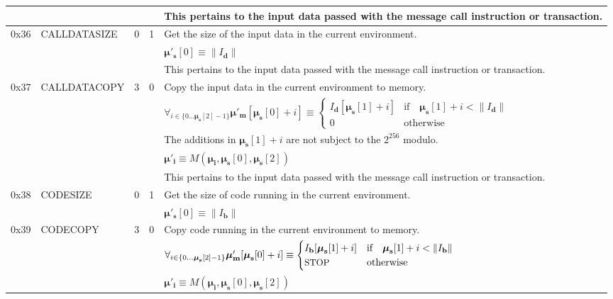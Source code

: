 \documentclass[9pt,oneside]{amsart}
\begin{document}
\begin{tabularx}{\textwidth}{rlrrX}
&&&& This pertains to the input data passed with the message call instruction or transaction. \\
\midrule
0x36 & {\small CALLDATASIZE} & 0 & 1 & Get the size of the input data in the current environment. \\
&&&& $\boldsymbol{\mu}'_\mathbf{s}[0] \equiv \lVert I_\mathbf{d} \rVert$ \\
&&&& This pertains to the input data passed with the message call instruction or transaction. \\
\midrule
0x37 & {\small CALLDATACOPY} & 3 & 0 & Copy the input data in the current environment to memory. \\
&&&& $\forall_{i \in \{ 0 \dots \boldsymbol{\mu}_\mathbf{s}[2] - 1\} } \boldsymbol{\mu}'_\mathbf{m}[\boldsymbol{\mu}_\mathbf{s}[0] + i ] \equiv
\begin{cases} I_\mathbf{d}[\boldsymbol{\mu}_\mathbf{s}[1] + i] & \text{if} \quad \boldsymbol{\mu}_\mathbf{s}[1] + i < \lVert I_\mathbf{d} \rVert \\ 0 & \text{otherwise} \end{cases}$\\
&&&& The additions in $\boldsymbol{\mu}_\mathbf{s}[1] + i$ are not subject to the $2^{256}$ modulo. \\
&&&& $\boldsymbol{\mu}'_\mathbf{i} \equiv M(\boldsymbol{\mu}_\mathbf{i}, \boldsymbol{\mu}_\mathbf{s}[0], \boldsymbol{\mu}_\mathbf{s}[2])$ \\
&&&& This pertains to the input data passed with the message call instruction or transaction. \\
\midrule
0x38 & {\small CODESIZE} & 0 & 1 & Get the size of code running in the current environment. \\
&&&& $\boldsymbol{\mu}'_\mathbf{s}[0] \equiv \lVert I_\mathbf{b} \rVert$ \\
\midrule
0x39 & {\small CODECOPY} & 3 & 0 & Copy code running in the current environment to memory. \\
&&&& $\forall_{i \in \{ 0 \dots \boldsymbol{\mu}_\mathbf{s}[2] - 1\} } \boldsymbol{\mu}'_\mathbf{m}[\boldsymbol{\mu}_\mathbf{s}[0] + i ] \equiv
\begin{cases} I_\mathbf{b}[\boldsymbol{\mu}_\mathbf{s}[1] + i] & \text{if} \quad \boldsymbol{\mu}_\mathbf{s}[1] + i < \lVert I_\mathbf{b} \rVert \\ \text{\small STOP} & \text{otherwise} \end{cases}$\\
&&&& $\boldsymbol{\mu}'_\mathbf{i} \equiv M(\boldsymbol{\mu}_\mathbf{i}, \boldsymbol{\mu}_\mathbf{s}[0], \boldsymbol{\mu}_\mathbf{s}[2])$ \\

\end{tabularx}
\end{document}
